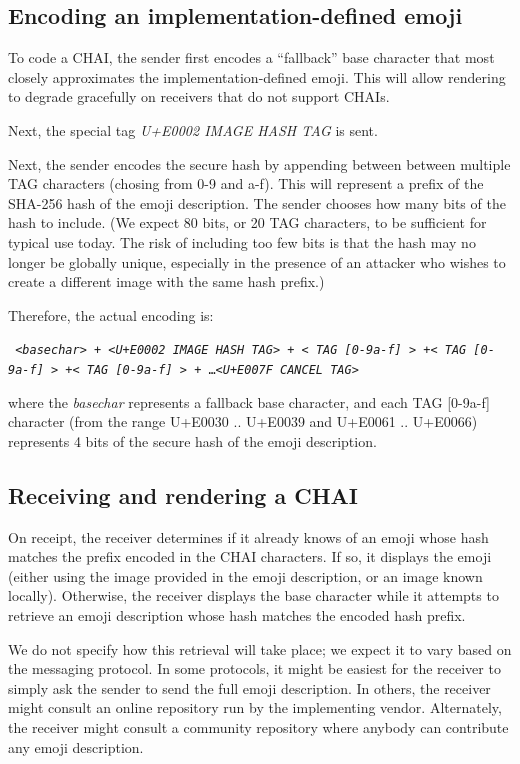 \documentclass[12pt]{article}
\begin{document}
\subsection{Encoding an implementation-defined emoji}

To code a CHAI, the sender first encodes a ``fallback'' base character
that most closely approximates the implementation-defined emoji. This
will allow rendering to degrade gracefully on receivers that do not
support CHAIs.

Next, the special tag \textit{U+E0002 IMAGE HASH TAG} is sent.


Next, the sender encodes the secure hash by appending between between
multiple TAG characters (chosing from 0-9 and a-f). This will represent a prefix of the
SHA-256 hash of the emoji description. The sender chooses how many
bits of the hash to include. (We expect 80 bits, or 20 TAG
characters, to be sufficient for typical use today. The risk of
including too few bits is that the hash may no longer be globally unique,
especially in the presence of an attacker who wishes to create a different
image with the same hash prefix.)

Therefore, the actual encoding is:

\texttt { <\textit{basechar}> + <\textit{U+E0002 IMAGE HASH TAG}> + <\textit{ TAG [0-9a-f] }> +<\textit{ TAG [0-9a-f] }> +<\textit{ TAG [0-9a-f] }> + \ldots <\textit{U+E007F CANCEL TAG}> }

where the \textit{basechar} represents a fallback base character, and
each TAG [0-9a-f] character (from the range U+E0030 .. U+E0039 and U+E0061
.. U+E0066) represents 4 bits of the secure hash of the emoji
description.

\subsection{Receiving and rendering a CHAI}

On receipt, the receiver determines if it already knows of an emoji
whose hash matches the prefix encoded in the CHAI characters. If so,
it displays the emoji (either using the image provided in the emoji
description, or an image known locally). Otherwise, the receiver
displays the base character while it attempts to retrieve an emoji
description whose hash matches the encoded hash prefix.

We do not specify how this retrieval will take place; we expect it to
vary based on the messaging protocol. In some protocols, it might be
easiest for the receiver to simply ask the sender to send the full
emoji description. In others, the receiver might consult an online
repository run by the implementing vendor. Alternately, the receiver
might consult a community repository where anybody can contribute any
emoji description.
\end{document}

